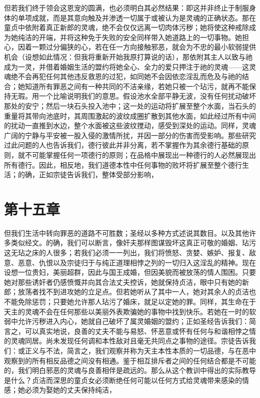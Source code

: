 但若我们终于领会这恩宠的圆满，也必须明白其必然结果：即这并非终止于制服身体的单项成就，而是其意向触及并渗透一切属于或被认为是灵魂的正确状态。那在童贞中依附着真正新郎的灵魂，绝不会仅仅远离一切肉体污秽；她将使这种戒除成为她纯洁的开端，并将这种免于失败的安全同样带入她道路上的一切事物。她担心，因着一颗过分偏狭的心，若在任一方向接触邪恶，就会为不忠的最小软弱提供机会（设想如此情况：但我将重新开始我原打算说的话），那依附其主人以致与祂成为一灵，并借着婚姻生活的盟约将她全心、全力的爱只押注于祂的灵魂——这灵魂绝不会再犯任何其他违反救恩的过犯，如同她不会因依恋淫乱而危及与祂的结合；她知道所有罪恶之间有一种共同的不洁亲缘，若她只被一个玷污，就再不能保持无瑕。用一个比喻说明我们的意思。假设池水全部平静无波，没有任何扰动破坏那处的安宁；然后一块石头投入池中；这一处的运动将扩展至整个水面，当石头的重量将其带向池底时，其周围激起的波纹成圈扩散到其他水面，如此经过所有中间的扰动一直推到水边，整个水面被这些波纹搅动，感受到深处的运动。同样，灵魂广阔的宁静与平安被一股入侵的激情所扰，并因一部分的伤害而受影响。那些研究过此问题的人也告诉我们，德行彼此并非分离，若不掌握作为其余德行基础的原则，就不可能掌握任何一项德行的原则；在品格中展现出一种德行的人必然展现出所有德行。因此，相反地，我们道德本性中任何事物的败坏将扩展至整个德行生活；的确，正如宗徒告诉我们，整体受部分影响，\par


\section{第十五章}

但我们生活中转向罪恶的道路不可胜数；圣经以多种方式述说其数目。以及其他许多类似经文。的确，我们可以断言，像奸夫那样图谋毁坏这真正可敬的婚姻、玷污这无玷之床的人很多；若我们必须一一列出，我们将愤怒、贪婪、嫉妒、报复、敌意、恶意、仇恨以及宗徒归于与纯正道理相悖之列的一切归入这淫乱的精神。现在设想一位贵妇，美丽超群，因此与国王成婚，但因美貌而被放荡的情人围困。只要她对那些诱奸者仍感愤慨并向其合法丈夫控诉，她就保持贞洁，眼中只有她的新郎；放荡者找不到进攻她的立足点。但若她听从了其中一人，她对其余人的贞洁也不能免除惩罚；只要她允许那人玷污了婚床，就足以定她的罪。同样，其生命在于天主的灵魂不会在任何那些以美丽外表欺骗她的事物中找到快乐。若她在一时的软弱中允许污秽进入内心，她就自己破坏了属灵婚姻的盟约；正如圣经告诉我们：简言之，可以真实地说，良善的丈夫不能与易怒、怀恶意或怀有任何与和谐相悖之情的灵魂同居。尚未发现任何调和本性敌对且毫无共同点之事物的途径。宗徒告诉我们：或正义与不法，简言之，我们观察并称为天主本性本质的一切品德，与在恶中观察到的所有相反品德之间没有相通。鉴于相互排斥者之间的任何结合都是不可能的，我们明白邪恶的灵魂与良善相伴是疏远的。那么从这个教训中得出的实际教导是什么？贞洁而深思的童贞女必须断绝任何可能以任何方式给灵魂带来感染的情感；她必须为娶她的丈夫保持纯洁，\par

